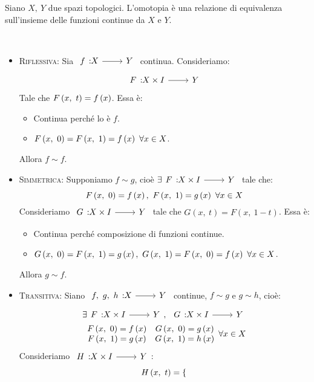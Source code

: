 \begin{lemming}
	Siano $X,\ Y$ due spazi topologici. L'omotopia è una relazione di equivalenza sull'insieme delle funzioni continue da $X$ e $Y$.
\end{lemming}
\begin{demonstration}~{}
	\begin{itemize}
		\item \textsc{Riflessiva}: Sia $\funz{f}{X}{Y}$ continua. Consideriamo:
		\begin{equation*}
			\funz{F}{X\times I}{Y}
		\end{equation*}
	Tale che $F\left(x,\ t\right)=f\left(x\right)$. Essa è:
		\begin{itemize}
			\item Continua perché lo è $f$.
			\item $\mvf{F}{x}{0}=\mvf{F}{x}{1}=f\left(x\right)\ \forall x\in X$.	\end{itemize}
		Allora $f\sim f$.
		\item \textsc{Simmetrica}: Supponiamo $f\sim g$, cioè $\exists \funz{F}{X\times I}{Y}$ tale che:
		\begin{equation*}
			\mvf{F}{x}{0}=f\left(x\right),\ \mvf{F}{x}{1}=g\left(x\right)\ \forall x\in X
		\end{equation*}
	Consideriamo $\funz{G}{X\times I}{Y}$ tale che $G\left(x,\ t\right)=F\left(x,\ 1-t\right)$. Essa è:
	\begin{itemize}
		\item Continua perché composizione di funzioni continue.
		\item $\mvf{G}{x}{0}=\mvf{F}{x}{1}=g\left(x\right),\ \mvf{G}{x}{1}=\mvf{F}{x}{0}=f\left(x\right)\ \forall x\in X$.
	\end{itemize}
Allora $g\sim f$.
\item \textsc{Transitiva}: Siano $\funz{f,\ g,\ h}{X}{Y}$ continue, $f\sim g$ e $g\sim h$, cioè:
\begin{gather*}
	\exists \funz{F}{X\times I}{Y},\ \funz{G}{X\times I}{Y}\\
	\begin{array}{cc}
		\mvf{F}{x}{0}=f\left(x\right) & \mvf{G}{x}{0}=g\left(x\right)\\
		\mvf{F}{x}{1}=g\left(x\right) & \mvf{G}{x}{1}=h\left(x\right)
	\end{array}
\forall x\in X
\end{gather*}
Consideriamo $\funz{H}{X\times I}{Y}$:
\begin{equation*}
	H\left(x,\ t\right)=\begin{cases}

\end{cases}
\end{equation*}
\end{itemize}
\end{demonstration}
